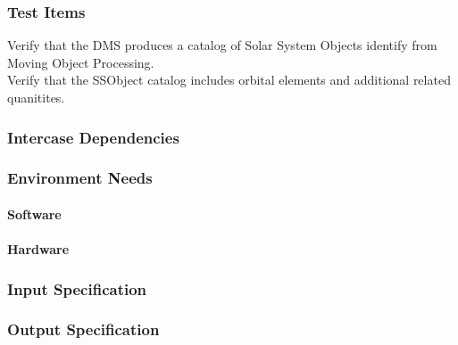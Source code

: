 \subsubsection{Test Items}
Verify that the DMS produces a catalog of Solar System Objects identify
from Moving Object Processing.\\
Verify that the SSObject catalog includes orbital elements and
additional related quanitites.



\subsubsection{Intercase Dependencies}

\subsubsection{Environment Needs}

\paragraph{Software}

\paragraph{Hardware}

\subsubsection{Input Specification}

\subsubsection{Output Specification}

